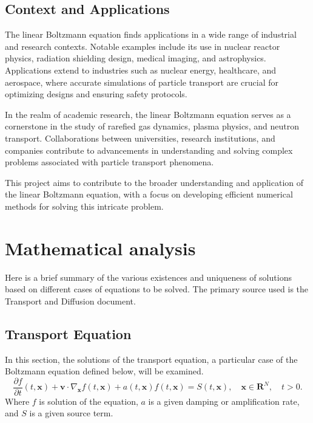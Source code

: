 \documentclass[a4paper, 11pt]{article}
\newcommand{\bm}{\symbf}
\begin{document}
\subsection{Context and Applications}


The linear Boltzmann equation finds applications in a wide range of industrial and research contexts. Notable examples include its use in nuclear reactor physics, radiation shielding design, medical imaging, and astrophysics. Applications extend to industries such as nuclear energy, healthcare, and aerospace, where accurate simulations of particle transport are crucial for optimizing designs and ensuring safety protocols.

In the realm of academic research, the linear Boltzmann equation serves as a cornerstone in the study of rarefied gas dynamics, plasma physics, and neutron transport. Collaborations between universities, research institutions, and companies contribute to advancements in understanding and solving complex problems associated with particle transport phenomena.


\medbreak

This project aims to contribute to the broader understanding and application of the linear Boltzmann equation, with a focus on developing efficient numerical methods for solving this intricate problem.


\section{Mathematical analysis}

Here is a brief summary of the various existences and uniqueness of solutions based on different cases of equations to be solved. The primary source used is the Transport and Diffusion \cite{allaire:2019} document.

\subsection{Transport Equation}

In this section, the solutions of the transport equation, a particular case of the Boltzmann equation defined below, will be examined.
\begin{equation} \label{transport}
\frac{\partial f}{\partial t}(t,\bm{x})+\bm{v} \cdot \nabla_{\bm{x}} f(t,\bm{x}) + a(t,\bm{x})f(t,\bm{x}) = S(t,\bm{x}), \quad \bm{x} \in \bm{R}^N, \quad t>0.
\end{equation}
Where $f$ is solution of the equation, $a$ is a given damping or amplification rate, and $S$ is a given source term.
\end{document}
